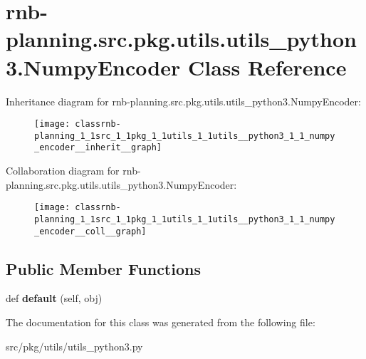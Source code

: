 \hypertarget{classrnb-planning_1_1src_1_1pkg_1_1utils_1_1utils__python3_1_1_numpy_encoder}{}\section{rnb-\/planning.src.\+pkg.\+utils.\+utils\+\_\+python3.\+Numpy\+Encoder Class Reference}
\label{classrnb-planning_1_1src_1_1pkg_1_1utils_1_1utils__python3_1_1_numpy_encoder}


Inheritance diagram for rnb-\/planning.src.\+pkg.\+utils.\+utils\+\_\+python3.\+Numpy\+Encoder\+:\nopagebreak
\begin{figure}[H]
\begin{center}
\leavevmode
\texttt{[image: classrnb-planning\_1\_1src\_1\_1pkg\_1\_1utils\_1\_1utils\_\_python3\_1\_1\_numpy\_encoder\_\_inherit\_\_graph]}
\end{center}
\end{figure}


Collaboration diagram for rnb-\/planning.src.\+pkg.\+utils.\+utils\+\_\+python3.\+Numpy\+Encoder\+:\nopagebreak
\begin{figure}[H]
\begin{center}
\leavevmode
\texttt{[image: classrnb-planning\_1\_1src\_1\_1pkg\_1\_1utils\_1\_1utils\_\_python3\_1\_1\_numpy\_encoder\_\_coll\_\_graph]}
\end{center}
\end{figure}
\subsection*{Public Member Functions}
\begin{DoxyCompactItemize}
\item 
\mbox{\label{classrnb-planning_1_1src_1_1pkg_1_1utils_1_1utils__python3_1_1_numpy_encoder_ad76c28d68334716885ab99757896b73e}} 
def {\bfseries default} (self, obj)
\end{DoxyCompactItemize}


The documentation for this class was generated from the following file\+:\begin{DoxyCompactItemize}
\item 
src/pkg/utils/utils\+\_\+python3.\+py\end{DoxyCompactItemize}
